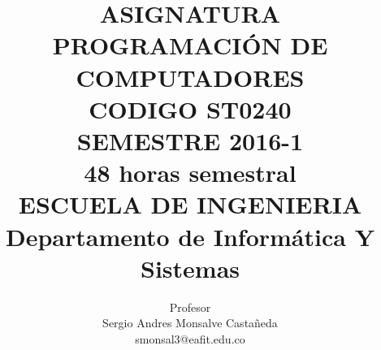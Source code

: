 \documentclass[11pt,letterpaper]{article}
\title{
	ASIGNATURA\\
	PROGRAMACIÓN DE COMPUTADORES\\
	CODIGO ST0240\\[2cm]
	SEMESTRE 2016-1\\
	48 horas semestral\\
	ESCUELA DE INGENIERIA\\[1cm]
	Departamento de Informática Y Sistemas
}
\author{
	Profesor\\
	Sergio Andres Monsalve Castañeda\\
	smonsal3@eafit.edu.co
}
\begin{document}
 
\pagestyle{fancyplain}
\fancyhf{}
\headheight=20pt %
\renewcommand{\headrulewidth}{0pt} %


\fancyfoot[c]{\thepage}

\maketitle

\begin{minipage}{3cm}
\end{minipage}



%





\end{document}
